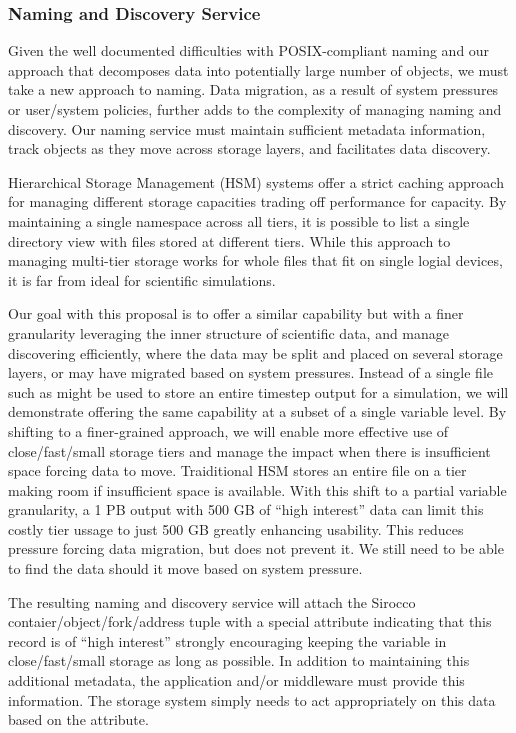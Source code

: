\subsubsection{Naming and Discovery Service}

Given the well documented difficulties with POSIX-compliant naming and our
approach that decomposes data into potentially large number of objects, 
we must take a new approach to naming.
Data migration, as a result of system pressures or user/system policies,
further adds to the complexity of managing naming and discovery. Our naming
service must maintain sufficient metadata information, track objects
as they move across storage layers, and facilitates data discovery.

Hierarchical Storage Management (HSM) systems \cite{hsm} offer a strict caching approach
for managing different storage capacities trading off performance for capacity.
By maintaining a single namespace across all tiers, it is possible to list a
single directory view with files stored at different tiers. While this approach
to managing multi-tier storage works for whole files that fit on single logial
devices, it is far from ideal for scientific simulations.

Our goal with this proposal is to offer a similar capability but with a finer
granularity leveraging the inner structure of scientific data, 
and manage discovering efficiently, where the data may
be split and placed on several storage layers, or may have migrated
based on system pressures. Instead of a single file such as might be used to
store an entire timestep output for a simulation, we will demonstrate offering
the same capability at a subset of a single variable level. By shifting to a
finer-grained approach, we will enable more effective use of close/fast/small
storage tiers and manage the impact when there is insufficient space forcing
data to move. Traiditional HSM stores an entire file on a tier making room if
insufficient space is available. With this shift to a partial variable
granularity, a 1 PB output with 500 GB of ``high interest'' data can limit this
costly tier ussage to just 500 GB greatly enhancing usability. This reduces
pressure forcing data migration, but does not prevent it. We still need to be
able to find the data should it move based on system pressure.

The resulting naming and discovery service will attach the Sirocco
contaier/object/fork/address tuple with a special attribute indicating that
this record is of ``high interest'' strongly encouraging keeping the variable
in close/fast/small storage as long as possible. In addition to maintaining
this additional metadata, the application and/or middleware must provide this
information. The storage system simply needs to act appropriately on this data
based on the attribute.

